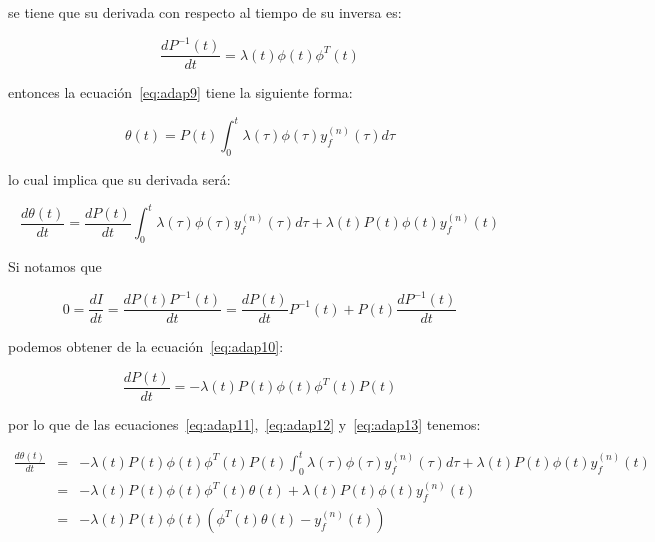             se tiene que su derivada con respecto al tiempo de su inversa es:

            \begin{equation} \label{eq:adap10}
                \frac{d P^{-1}(t)}{dt} = \lambda(t) \phi(t) \phi^T(t)
            \end{equation}

            entonces la ecuación~\ref{eq:adap9} tiene la siguiente forma:

            \begin{equation} \label{eq:adap11}
                \theta(t) = P(t) \int_0^t \lambda(\tau) \phi(\tau) y_f^{(n)}(\tau) d\tau
            \end{equation}

            lo cual implica que su derivada será:

            \begin{equation} \label{eq:adap12}
                \frac{d \theta(t)}{dt} = \frac{d P(t)}{dt} \int_0^t \lambda(\tau) \phi(\tau) y_f^{(n)}(\tau) d\tau + \lambda(t) P(t) \phi(t) y_f^{(n)}(t)
            \end{equation}

            Si notamos que

            \begin{equation*}
                0 = \frac{dI}{dt} = \frac{dP(t) P^{-1}(t)}{dt} = \frac{dP(t)}{dt} P^{-1}(t) + P(t) \frac{dP^{-1}(t)}{dt}
            \end{equation*}

            podemos obtener de la ecuación~\ref{eq:adap10}:

            \begin{equation} \label{eq:adap13}
                \frac{d P(t)}{dt} = - \lambda(t) P(t) \phi(t) \phi^T(t) P(t)
            \end{equation}

            por lo que de las ecuaciones~\ref{eq:adap11},~\ref{eq:adap12} y~\ref{eq:adap13} tenemos:

            \begin{eqnarray*}
                \frac{d \theta(t)}{dt} & = & - \lambda(t) P(t) \phi(t) \phi^T(t) P(t) \int_0^t \lambda(\tau) \phi(\tau) y_f^{(n)}(\tau) d\tau + \lambda(t) P(t) \phi(t) y_f^{(n)}(t) \\
                & = & - \lambda(t) P(t) \phi(t) \phi^T(t) \theta(t) + \lambda(t) P(t) \phi(t) y_f^{(n)}(t) \\
                & = & - \lambda(t) P(t) \phi(t) \left( \phi^T(t) \theta(t) - y_f^{(n)}(t) \right)
            \end{eqnarray*}

